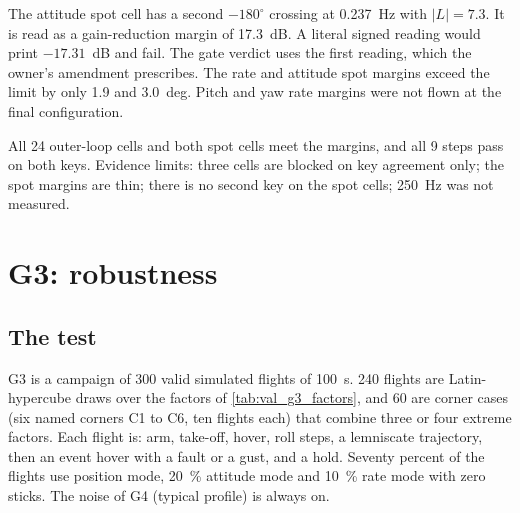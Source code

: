The attitude spot cell has a second $-180^\circ$ crossing at 0.237~Hz with $|L|=7.3$.
It is read as a gain-reduction margin of 17.3~dB.
A literal signed reading would print $-17.31$~dB and fail.
The gate verdict uses the first reading, which the owner's amendment prescribes.
The rate and attitude spot margins exceed the limit by only 1.9 and 3.0~deg.
Pitch and yaw rate margins were not flown at the final configuration.


\begin{keyresult}
All 24 outer-loop cells and both spot cells meet the margins, and all 9 steps pass on both keys.
Evidence limits: three cells are blocked on key agreement only; the spot margins are thin; there is no second key on the spot cells; 250~Hz was not measured.
\end{keyresult}

\section{G3: robustness}\label{sec:val_g3}

\subsection{The test}

G3 is a campaign of 300 valid simulated flights of 100~s.
240 flights are Latin-hypercube draws over the factors of \cref{tab:val_g3_factors}, and 60 are corner cases (six named corners C1 to C6, ten flights each) that combine three or four extreme factors.
Each flight is: arm, take-off, hover, roll steps, a lemniscate trajectory, then an event hover with a fault or a gust, and a hold.
Seventy percent of the flights use position mode, 20~\% attitude mode and 10~\% rate mode with zero sticks.
The noise of G4 (typical profile) is always on.

